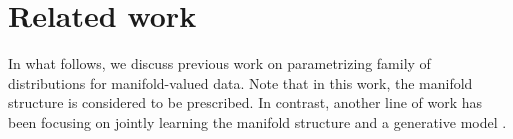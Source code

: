 \section{Related work}
\label{sec:related-works}

In what follows, we discuss previous work on parametrizing family of distributions for manifold-valued data. %
Note that in this work, the manifold structure is considered to be prescribed.
In contrast, another line of work has been focusing on jointly learning the manifold structure and a generative model
\citep{brehmer2020flows,kalatzis2021multi,caterini2021Rectangular}.


